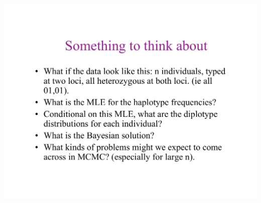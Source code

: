 \newslide{}
\mbox{}
\vspace*{\VertUp}
\enlargethispage*{1000pt}
\begin{center}
\includegraphics*[width=\textwidth]{PPT_pages/pg_0047.pdf}
\end{center}



 